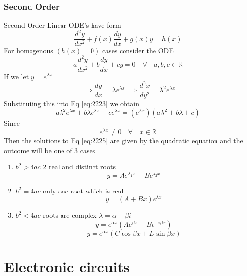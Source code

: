 \documentclass[11pt,titlepage]{article}
\numberwithin{equation}{subsection}
\begin{document}
\subsubsection{Second Order}
Second Order Linear ODE's have form
\begin{equation}
    \frac{d^2y}{dx^2}+f(x)\frac{dy}{dx}+g(x)y=h(x)
\end{equation}
For homogenous $(h(x)=0)$ cases consider the ODE
\begin{equation}\label{eq:2223}
     a\frac{d^2y}{dx^2}+b\frac{dy}{dx}+cy=0\quad\forall\quad a,b,c\in\mathbb R
\end{equation}
If we let $y=e^{\lambda x}$
\begin{equation}
    \implies \frac{dy}{dx}=\lambda e^{\lambda x} \implies \frac{d^2x}{dy^2} = \lambda^2e^{\lambda x}
\end{equation}
Substituting this into Eq \eqref{eq:2223} we obtain
\begin{equation}\label{eq:2225}
    a\lambda^2e^{\lambda x}+b \lambda e^{\lambda x}+ce^{\lambda x}
    =(e^{\lambda x})(a\lambda^2+b\lambda+c)
\end{equation}
Since\begin{equation}
e^{\lambda x}\neq 0 \quad \forall \quad x \in \mathbb R
\end{equation}
Then the solutions to Eq \eqref{eq:2225} are given by the quadratic equation and the outcome will be one of 3 cases
\begin{enumerate}
    \item $b^2>4ac$ 2 real and distinct roots
    \begin{equation}
    y=Ae^{\lambda_1x}+Be^{\lambda_2x}
    \end{equation}
    \item $b^2=4ac$ only one root which is real
    \begin{equation}
        y=(A+Bx)e^{\lambda x}
    \end{equation}
    \item $b^2<4ac$ roots are complex $\lambda=\alpha \pm \beta i$
    \begin{equation}
      y=  e^{\alpha x}(Ae^{\beta x}+Be^{-i\beta x})
    \end{equation}
    \begin{equation}
      y=  e^{\alpha x}(C\cos\beta x+D\sin\beta x)
    \end{equation}
\end{enumerate}
\section{Electronic circuits}
\end{document}
